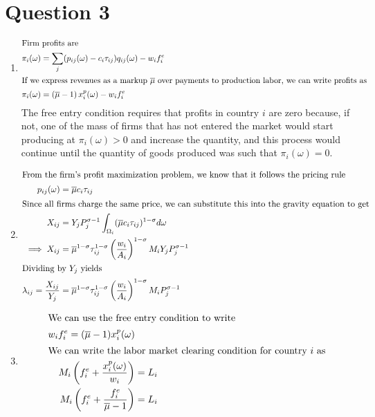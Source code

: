 \section{Question 3}
\begin{enumerate}
\item
  \begin{align*}
    \intertext{Firm profits are}
    \pi_i(\omega) &= \sum_j (p_{ij} (\omega) - c_i \tau_{ij})q_{ij} (\omega) - w_i f_i^e\\
    \intertext{If we express revenues as a markup $\overline{\mu}$ over payments to production labor, we can write profits as }
    \pi_i (\omega) &= \left(\overline{\mu} - 1\right)x_i^p (\omega) - w_i f_i^e
  \end{align*}
  The free entry condition requires that profits in country $i$ are zero because, if not, one of the mass of firms that has not entered the market would start producing at $\pi_i (\omega) > 0$ and increase the quantity, and this process would continue until the quantity of goods produced was such that $\pi_i (\omega) = 0$.
\item
  \begin{align*}
    \intertext{From the firm's profit maximization problem, we know that it follows the pricing rule}
    p_{ij} (\omega) &= \overline{\mu} c_i \tau_{ij}\\
    \intertext{Since all firms charge the same price, we can substitute this into the gravity equation to get}
    X_{ij} &= Y_j P_j^{\sigma - 1} \int_{\Omega_i} (\overline{\mu}c_i \tau_{ij})^{1 - \sigma} d\omega \\
    \implies X_{ij} &= \overline{\mu}^{1 - \sigma} \tau_{ij}^{1 - \sigma} \left(\frac{w_i}{A_i}\right)^{1 - \sigma} M_i Y_j P_j^{\sigma - 1}\\
    \intertext{Dividing by $Y_j$ yields}
    \lambda_{ij} =\frac{X_{ij}}{Y_j} &= \overline{\mu}^{1 - \sigma} \tau_{ij}^{1 - \sigma}\left(\frac{w_i}{A_i}\right)^{1 - \sigma} M_i P_j^{\sigma - 1}\\
  \end{align*}
\item
  \begin{align*}
    \intertext{We can use the free entry condition to write}
    w_i f_i^e = (\overline{\mu} - 1) x_i^p (\omega)\\
    \intertext{We can write the labor market clearing condition for country $i$ as}
    M_i \left(f_i^e + \frac{x^p_i(\omega)}{w_i}\right) &= L_i\\
    M_i \left(f_i^e + \frac{f_i^e}{\overline{\mu} - 1}\right)&= L_i\\

\end{align*}
\end{enumerate}
